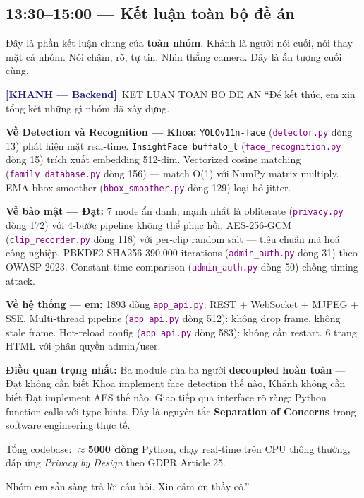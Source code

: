 \documentclass[12pt, a4paper]{article}
\newcommand{\khanh}{\textcolor{MidnightBlue}{\textbf{[KHANH --- Backend]}}}
\newcommand{\fpath}[1]{\texttt{\textcolor{purple}{#1}}}
\begin{document}
\subsection{13:30--15:00 --- Kết luận toàn bộ đề án}

\begin{warn}
Đây là phần kết luận chung của \textbf{toàn nhóm}. Khánh là người nói cuối, nói thay mặt cả nhóm. Nói chậm, rõ, tự tin. Nhìn thẳng camera. Đây là ấn tượng cuối cùng.
\end{warn}

\begin{dialog}{\khanh\ KET LUAN TOAN BO DE AN}
``Để kết thúc, em xin tổng kết những gì nhóm đã xây dựng.

\textbf{Về Detection và Recognition --- Khoa:}
\texttt{YOLOv11n-face} (\fpath{detector.py} dòng 13) phát hiện mặt real-time.
\texttt{InsightFace buffalo\_l} (\fpath{face\_recognition.py} dòng 15) trích xuất embedding 512-dim.
Vectorized cosine matching (\fpath{family\_database.py} dòng 156) --- match O(1) với NumPy matrix multiply.
EMA bbox smoother (\fpath{bbox\_smoother.py} dòng 129) loại bỏ jitter.

\textbf{Về bảo mật --- Đạt:}
7 mode ẩn danh, mạnh nhất là obliterate (\fpath{privacy.py} dòng 172) với 4-bước pipeline không thể phục hồi.
AES-256-GCM (\fpath{clip\_recorder.py} dòng 118) với per-clip random salt --- tiêu chuẩn mã hoá công nghiệp.
PBKDF2-SHA256 390.000 iterations (\fpath{admin\_auth.py} dòng 31) theo OWASP 2023.
Constant-time comparison (\fpath{admin\_auth.py} dòng 50) chống timing attack.

\textbf{Về hệ thống --- em:}
1893 dòng \fpath{app\_api.py}: REST + WebSocket + MJPEG + SSE.
Multi-thread pipeline (\fpath{app\_api.py} dòng 512): không drop frame, không stale frame.
Hot-reload config (\fpath{app\_api.py} dòng 583): không cần restart.
6 trang HTML với phân quyền admin/user.

\textbf{Điều quan trọng nhất:}
Ba module của ba người \textbf{decoupled hoàn toàn} ---
Đạt không cần biết Khoa implement face detection thế nào,
Khánh không cần biết Đạt implement AES thế nào.
Giao tiếp qua interface rõ ràng: Python function calls với type hints.
Đây là nguyên tắc \textbf{Separation of Concerns} trong software engineering thực tế.

Tổng codebase: $\approx$\textbf{5000 dòng} Python, chạy real-time trên CPU thông thường,
đáp ứng \textit{Privacy by Design} theo GDPR Article 25.

Nhóm em sẵn sàng trả lời câu hỏi. Xin cảm ơn thầy cô.''
\end{dialog}
\end{document}
